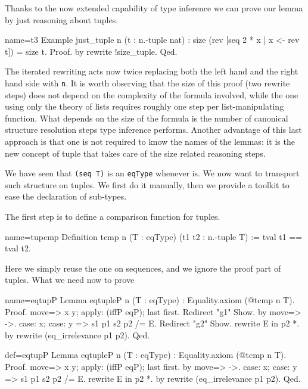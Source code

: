 Thanks to the now extended capability of type inference
we can prove our lemma by just reasoning about tuples.

\begin{coq}{name=t3}{}
Example just_tuple n (t : n.-tuple nat) :
  size (rev [seq 2 * x | x <- rev t]) = size t.
Proof. by rewrite !size_tuple. Qed.
\end{coq}

The iterated rewriting acts now twice replacing both the left hand
and the right hand side with \lstinline/n/.  It is worth observing
that the size of this proof (two rewrite steps) does not depend on the
complexity of the formula involved, while the one using only the
theory of lists requires roughly one step per list-manipulating function.
What depends on the size of the formula is the number of canonical
structure resolution steps type inference performs.  Another advantage
of this last approach is that one
is not required to know the names of the lemmas:
it is the new concept of tuple that takes care of the size related
reasoning steps.

\label{sec:subtypekit}

We have seen that \lstinline/(seq T)/ is an \lstinline/eqType/
whenever  is.  We now want to transport such  structure
on tuples.  We first do it manually, then we provide a toolkit
to ease the declaration of sub-types.

The first step is to define a comparison function for tuples.

\begin{coq}{name=tupcmp}{}
Definition tcmp n (T : eqType) (t1 t2 : n.-tuple T) := tval t1 == tval t2.
\end{coq}

Here we simply reuse the one on sequences, and we ignore the
proof part of tuples.  What we need now to prove

\begin{coqdef}{name=eqtupP}
Lemma eqtupleP n (T : eqType) : Equality.axiom (@tcmp n T).
Proof.
move=> x y; apply: (iffP eqP); last first.
Redirect "g1" Show.
  by move=> ->.
case: x; case: y => s1 p1 s2 p2 /= E. Redirect "g2" Show.
rewrite E in p2 *.
by rewrite (eq_irrelevance p1 p2).
Qed.
\end{coqdef}
\begin{coq}{def=eqtupP}{}
Lemma eqtupleP n (T : eqType) : Equality.axiom (@tcmp n T).
Proof.
move=> x y; apply: (iffP eqP); last first.
  by move=> ->.
case: x; case: y => s1 p1 s2 p2 /= E.
rewrite E in p2 *.
by rewrite (eq_irrelevance p1 p2).
Qed.
\end{coq}

